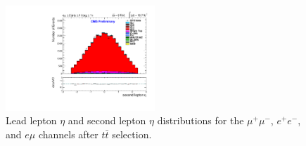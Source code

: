 \documentclass[oneside, a4paper, 11pt, ]{report}
\begin{document}
\begin{figure}
\includegraphics[width=0.5\textwidth]{Plots/ControlPlots/TTbarDiLeptonAnalysis/EMu/DiLepton/SecondLepton_Eta_splitTTbar_ratio.pdf}
\caption{Lead lepton $\eta$ and second lepton $\eta$ distributions for the $\mu^{+}\mu^{-}$, $e^{+}e^{-}$, and $e\mu$ channels after $t\bar{t}$ selection.}
\label{fig-leptonLeadEtaAndSecondEta}
\end{figure}
\end{document}
